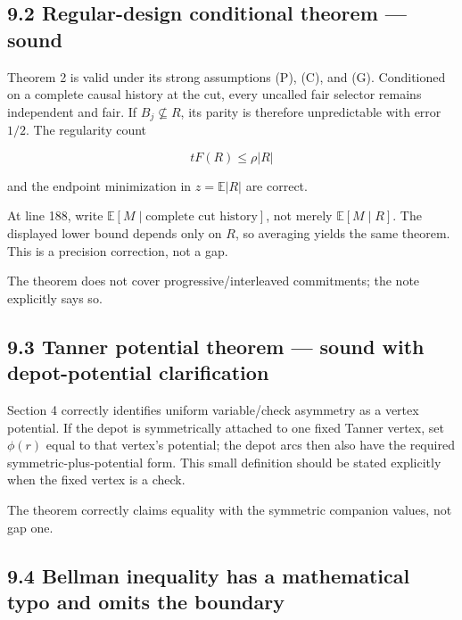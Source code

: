 \documentclass[11pt,a4paper]{article}
\begin{document}
\subsection*{9.2 Regular-design conditional theorem — sound}

Theorem 2 is valid under its strong assumptions (P), (C), and (G). Conditioned on a complete causal history at the cut, every uncalled fair selector remains independent and fair.  If \(B_j\not\subseteq R\), its parity is therefore unpredictable with error \(1/2\).  The regularity count


\[
 tF(R)\le\rho|R|
\]

and the endpoint minimization in \(z=\mathbb E|R|\) are correct.


At line 188, write \(\mathbb E[M\mid\text{complete cut history}]\), not merely \(\mathbb E[M\mid R]\).  The displayed lower bound depends only on \(R\), so averaging yields the same theorem.  This is a precision correction, not a gap.


The theorem does not cover progressive/interleaved commitments; the note explicitly says so.


\subsection*{9.3 Tanner potential theorem — sound with depot-potential clarification}

Section 4 correctly identifies uniform variable/check asymmetry as a vertex potential.  If the depot is symmetrically attached to one fixed Tanner vertex, set \(\phi(r)\) equal to that vertex's potential; the depot arcs then also have the required symmetric-plus-potential form.  This small definition should be stated explicitly when the fixed vertex is a check.


The theorem correctly claims equality with the symmetric companion values, not gap one.


\subsection*{9.4 Bellman inequality has a mathematical typo and omits the boundary}
\end{document}
